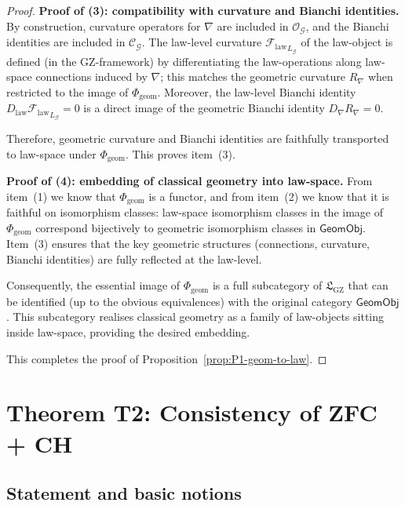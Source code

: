 \documentclass[11pt]{book}
\theoremstyle{plain}
\theoremstyle{definition}
\newcommand{\GZLS}{\ensuremath{\mathfrak{L}_{\mathrm{GZ}}}}       \newcommand{\GZLT}{\ensuremath{M_{!w}}}                           \newcommand{\GZLOC}{\ensuremath{A_M}}                             \newcommand{\GZLCurv}{\ensuremath{\mathcal{F}_{\mathrm{law}}}}
\begin{document}
\begin{proof}
\medskip\noindent
\textbf{Proof of (3): compatibility with curvature and Bianchi
identities.}
By construction, curvature operators for \(\nabla\) are included in
\(\mathcal{O}_{\mathcal{G}}\), and the Bianchi identities are included
in \(\mathcal{C}_{\mathcal{G}}\).  The law-level curvature
\({\GZLCurv}_{L_{\mathcal{G}}}\) of the law-object is defined (in the
GZ-framework) by differentiating the law-operations along law-space
connections induced by \(\nabla\); this matches the geometric
curvature \(R_{\nabla}\) when restricted to the image of
\(\Phi_{\mathrm{geom}}\).  Moreover, the law-level Bianchi identity
\(D_{\mathrm{law}}{\GZLCurv}_{L_{\mathcal{G}}}=0\) is a direct image of
the geometric Bianchi identity
\(D_{\nabla}R_{\nabla}=0\).

Therefore, geometric curvature and Bianchi identities are faithfully
transported to law-space under \(\Phi_{\mathrm{geom}}\).  This proves
item~\textnormal{(3)}.



\medskip\noindent
\textbf{Proof of (4): embedding of classical geometry into law-space.}
From item~\textnormal{(1)} we know that \(\Phi_{\mathrm{geom}}\) is a
functor, and from item~\textnormal{(2)} we know that it is faithful
on isomorphism classes: law-space isomorphism classes in the image of
\(\Phi_{\mathrm{geom}}\) correspond bijectively to geometric
isomorphism classes in \(\mathsf{GeomObj}\).  Item~\textnormal{(3)}
ensures that the key geometric structures (connections, curvature,
Bianchi identities) are fully reflected at the law-level.

Consequently, the essential image of \(\Phi_{\mathrm{geom}}\) is a
full subcategory of \(\GZLS\) that can be identified (up to the
obvious equivalences) with the original category \(\mathsf{GeomObj}\).
This subcategory realises classical geometry as a family of law-objects
sitting inside law-space, providing the desired embedding.

This completes the proof of
Proposition~\ref{prop:P1-geom-to-law}.
\end{proof}



\section{Theorem T2: Consistency of ZFC + CH}
\label{app:III-T2}

\subsection*{Statement and basic notions}
\end{document}
